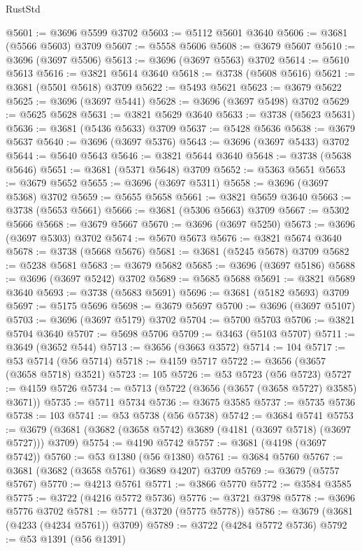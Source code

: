 \begin{lexlean}{RustStd}
\begin{coremodule}
@5601 := @3696 @5599 @3702
@5603 := @5112 @5601 @3640
@5606 := @3681 (@5566 @5603) @3709
@5607 := @5558 @5606
@5608 := @3679 @5607
@5610 := @3696 (@3697 @5506)
@5613 := @3696 (@3697 @5563) @3702
@5614 := @5610 @5613
@5616 := @3821 @5614 @3640
@5618 := @3738 (@5608 @5616)
@5621 := @3681 (@5501 @5618) @3709
@5622 := @5493 @5621
@5623 := @3679 @5622
@5625 := @3696 (@3697 @5441)
@5628 := @3696 (@3697 @5498) @3702
@5629 := @5625 @5628
@5631 := @3821 @5629 @3640
@5633 := @3738 (@5623 @5631)
@5636 := @3681 (@5436 @5633) @3709
@5637 := @5428 @5636
@5638 := @3679 @5637
@5640 := @3696 (@3697 @5376)
@5643 := @3696 (@3697 @5433) @3702
@5644 := @5640 @5643
@5646 := @3821 @5644 @3640
@5648 := @3738 (@5638 @5646)
@5651 := @3681 (@5371 @5648) @3709
@5652 := @5363 @5651
@5653 := @3679 @5652
@5655 := @3696 (@3697 @5311)
@5658 := @3696 (@3697 @5368) @3702
@5659 := @5655 @5658
@5661 := @3821 @5659 @3640
@5663 := @3738 (@5653 @5661)
@5666 := @3681 (@5306 @5663) @3709
@5667 := @5302 @5666
@5668 := @3679 @5667
@5670 := @3696 (@3697 @5250)
@5673 := @3696 (@3697 @5303) @3702
@5674 := @5670 @5673
@5676 := @3821 @5674 @3640
@5678 := @3738 (@5668 @5676)
@5681 := @3681 (@5245 @5678) @3709
@5682 := @5238 @5681
@5683 := @3679 @5682
@5685 := @3696 (@3697 @5186)
@5688 := @3696 (@3697 @5242) @3702
@5689 := @5685 @5688
@5691 := @3821 @5689 @3640
@5693 := @3738 (@5683 @5691)
@5696 := @3681 (@5182 @5693) @3709
@5697 := @5175 @5696
@5698 := @3679 @5697
@5700 := @3696 (@3697 @5107)
@5703 := @3696 (@3697 @5179) @3702
@5704 := @5700 @5703
@5706 := @3821 @5704 @3640
@5707 := @5698 @5706
@5709 := @3463 (@5103 @5707)
@5711 := @3649 (@3652 @544)
@5713 := @3656 (@3663 @3572)
@5714 := 104
@5717 := @53 @5714 (@56 @5714)
@5718 := @4159 @5717
@5722 := @3656 (@3657 (@3658 @5718) @3521)
@5723 := 105
@5726 := @53 @5723 (@56 @5723)
@5727 := @4159 @5726
@5734 := @5713 (@5722 (@3656 (@3657 (@3658 @5727) @3585) @3671))
@5735 := @5711 @5734
@5736 := @3675 @3585
@5737 := @5735 @5736
@5738 := 103
@5741 := @53 @5738 (@56 @5738)
@5742 := @3684 @5741
@5753 := @3679 (@3681 (@3682 (@3658 @5742) @3689 (@4181 (@3697 @5718) (@3697 @5727))) @3709)
@5754 := @4190 @5742
@5757 := @3681 (@4198 (@3697 @5742))
@5760 := @53 @1380 (@56 @1380)
@5761 := @3684 @5760
@5767 := @3681 (@3682 (@3658 @5761) @3689 @4207) @3709
@5769 := @3679 (@5757 @5767)
@5770 := @4213 @5761
@5771 := @3866 @5770
@5772 := @3584 @3585
@5775 := @3722 (@4216 @5772 @5736)
@5776 := @3721 @3798
@5778 := @3696 @5776 @3702
@5781 := @5771 (@3720 (@5775 @5778))
@5786 := @3679 (@3681 (@4233 (@4234 @5761)) @3709)
@5789 := @3722 (@4284 @5772 @5736)
@5792 := @53 @1391 (@56 @1391)

\end{coremodule}
\end{lexlean}
